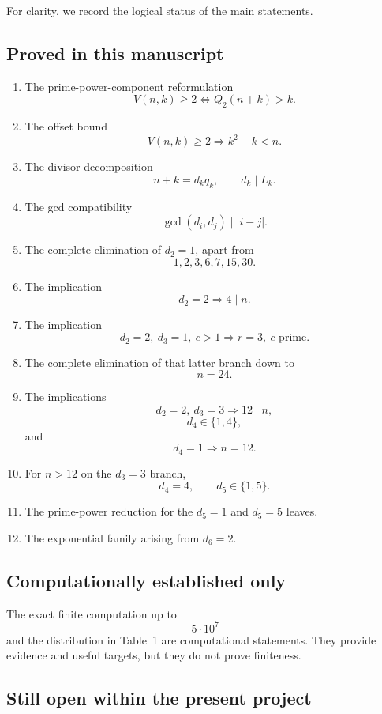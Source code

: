\documentclass[11pt]{article}
\begin{document}
For clarity, we record the logical status of the main statements.

\subsection*{Proved in this manuscript}

\begin{enumerate}[label=\arabic*.]
    \item The prime-power-component reformulation
    \[
    V(n,k)\geq2\iff Q_2(n+k)>k.
    \]
    \item The offset bound
    \[
    V(n,k)\geq2\Longrightarrow k^2-k<n.
    \]
    \item The divisor decomposition
    \[
    n+k=d_kq_k,\qquad d_k\mid L_k.
    \]
    \item The gcd compatibility
    \[
    \gcd(d_i,d_j)\mid|i-j|.
    \]
    \item The complete elimination of \(d_2=1\), apart from
    \[
    1,2,3,6,7,15,30.
    \]
    \item The implication
    \[
    d_2=2\Longrightarrow4\mid n.
    \]
    \item The implication
    \[
    d_2=2,\ d_3=1,\ c>1
    \Longrightarrow r=3,\ c\text{ prime}.
    \]
    \item The complete elimination of that latter branch down to
    \[
    n=24.
    \]
    \item The implications
    \[
    d_2=2,\ d_3=3\Longrightarrow12\mid n,
    \]
    \[
    d_4\in\{1,4\},
    \]
    and
    \[
    d_4=1\Longrightarrow n=12.
    \]
    \item For \(n>12\) on the \(d_3=3\) branch,
    \[
    d_4=4,\qquad d_5\in\{1,5\}.
    \]
    \item The prime-power reduction for the \(d_5=1\) and \(d_5=5\) leaves.
    \item The exponential family arising from \(d_6=2\).
\end{enumerate}

\subsection*{Computationally established only}

The exact finite computation up to
\[
5\cdot10^7
\]
and the distribution in Table~1 are computational statements.  They provide
evidence and useful targets, but they do not prove finiteness.

\subsection*{Still open within the present project}
\end{document}
